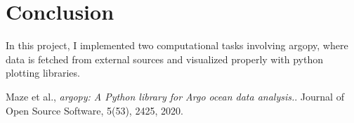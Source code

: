 \documentclass[12pt]{article}
\begin{document}
\section{Conclusion}
In this project, I implemented two computational tasks involving argopy, where
data is fetched from external sources and visualized properly with python plotting
libraries.

\begin{thebibliography}{9}
    Maze et al.,
    \textit{argopy: A Python library for Argo ocean data analysis.}. 
    Journal of Open Source Software, 5(53), 2425, 2020.
\end{thebibliography}
\end{document}

